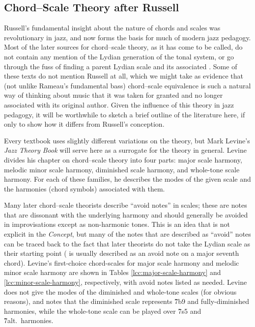 \subsection{Chord--Scale Theory after Russell}
\label{subsec:chord-scale-reception}

Russell's fundamental insight about the nature of chords and scales was
revolutionary in jazz, and now forms the basis for much of modern jazz
pedagogy. Most of the later sources for chord--scale theory, as it has come to
be called, do not contain any mention of the Lydian generation of the tonal
system, or go through the fuss of finding a parent Lydian scale and its
associated . Some of these texts do not mention Russell at all,
which we might take as evidence that (not unlike Rameau's fundamental bass)
chord--scale equivalence is such a natural way of thinking about music that it
was taken for granted and no longer associated with its original author. Given
the influence of this theory in jazz pedagogy, it will be worthwhile to sketch
a brief outline of the literature here, if only to show how it differs from
Russell's conception.

Every textbook uses slightly different variations on the theory, but Mark
Levine's \emph{Jazz Theory Book} will serve here as a surrogate for the theory
in general. Levine divides his chapter on chord--scale theory into
four parts: major scale harmony, melodic minor scale harmony, diminished scale
harmony, and whole-tone scale harmony. For each of these families, he
describes the modes of the given scale and the harmonies (chord symbols)
associated with them.

Many later chord--scale theorists describe ``avoid notes'' in scales; these
are notes that are dissonant with the underlying harmony and should generally
be avoided in improvisations except as non-harmonic tones. This is an idea
that is not explicit in the \emph{Concept}, but many of the notes that are
described as ``avoid'' notes can be traced back to the fact that later
theorists do not take the Lydian scale as their starting point ( is
usually described as an avoid note on a major seventh chord). Levine's
first-choice chord-scales for major scale harmony and melodic minor scale
harmony are shown in Tables \ref{lcc:major-scale-harmony} and
\ref{lcc:minor-scale-harmony}, respectively, with avoid notes listed as
needed. Levine does not give the modes of the diminished and
whole-tone scales (for obvious reasons), and notes that the diminished scale
represents \h{7b9} and fully-diminished harmonies, while the whole-tone scale
can be played over \h{7s5} and \h{7alt.}\ harmonies.

